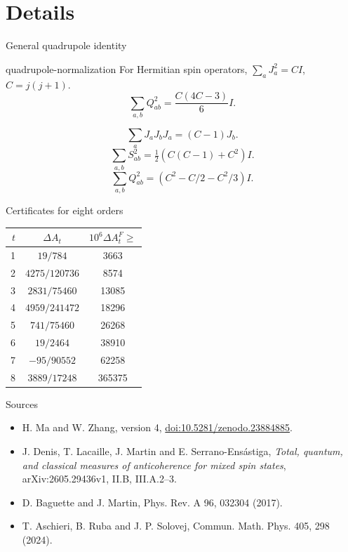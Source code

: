 \documentclass{beamer}
\begin{document}
\section{Details}
\begin{frame}{General quadrupole identity}
\begin{bookresult}{quadrupole-normalization}
For Hermitian spin operators, $\sum_aJ_a^2=CI$, $C=j(j+1)$.
\[\sum_{a,b}Q_{ab}^2=\frac{C(4C-3)}6I.\]
\end{bookresult}
\[\sum_aJ_aJ_bJ_a=(C-1)J_b.\]
\[\sum_{a,b}S_{ab}^2=\tfrac12(C(C-1)+C^2)I.\]
\[\sum_{a,b}Q_{ab}^2=(C^2-C/2-C^2/3)I.\]
\end{frame}
\begin{frame}{Certificates for eight orders}
\centering\small
\begin{tabular}{rcc}
$t$ & $\Delta A_t$ & $10^6\Delta A_t^F\geq$\\\hline
1 & $19/784$ & 3663\\
2 & $4275/120736$ & 8574\\
3 & $2831/75460$ & 13085\\
4 & $4959/241472$ & 18296\\
5 & $741/75460$ & 26268\\
6 & $19/2464$ & 38910\\
7 & $-95/90552$ & 62258\\
8 & $3889/17248$ & 365375
\end{tabular}
\end{frame}
\begin{frame}{Sources}
\footnotesize
\begin{itemize}
\item H. Ma and W. Zhang, version 4, \href{https://doi.org/10.5281/zenodo.23884885}{doi:10.5281/zenodo.23884885}.
\item J. Denis, T. Lacaille, J. Martin and E. Serrano-Ens\'astiga, \emph{Total, quantum, and classical measures of anticoherence for mixed spin states}, arXiv:2605.29436v1, II.B, III.A.2--3.
\item D. Baguette and J. Martin, Phys. Rev. A 96, 032304 (2017).
\item T. Aschieri, B. Ruba and J. P. Solovej, Commun. Math. Phys. 405, 298 (2024).
\end{itemize}
\end{frame}
\FormalVerification
\end{document}
